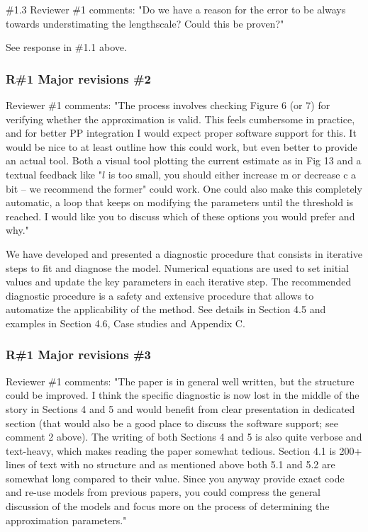 \documentclass[11pt]{report}
\begin{document}
\noindent \#1.3 Reviewer \#1 comments: "Do we have a reason for the error to be always towards understimating the lengthscale? Could this be proven?"

See response in \#1.1 above.


\subsubsection*{R\#1 Major revisions \#2}

Reviewer \#1 comments: "The process involves checking Figure 6 (or 7) for verifying whether the approximation is valid. This feels cumbersome in practice, and for better PP integration I would expect proper software support for this. It would be nice to at least outline how this could work, but even better to provide an actual tool. Both a visual tool plotting the current estimate as in Fig 13 and a textual feedback like "$\hat l$ is too small, you should either increase m or decrease c a bit -- we recommend the former" could work. One could also make this completely automatic, a loop that keeps on modifying the parameters until the threshold is reached. I would like you to discuss which of these options you would prefer and why."

We have developed and presented a diagnostic procedure that consists in iterative steps to fit and diagnose the model. Numerical equations are used to set initial values and update the key parameters in each iterative step. The recommended diagnostic procedure is a safety and extensive procedure that allows to automatize the applicability of the method. See details in Section 4.5 and examples in Section 4.6, Case studies and Appendix C.

\subsubsection*{R\#1 Major revisions \#3}

Reviewer \#1 comments: "The paper is in general well written, but the structure could be improved. I think the specific diagnostic is now lost in the middle of the story in Sections 4 and 5 and would benefit from clear presentation in dedicated section (that would also be a good place to discuss the software support; see comment 2 above). The writing of both Sections 4 and 5 is also quite verbose and text-heavy, which makes reading the paper somewhat tedious. Section 4.1 is 200+ lines of text with no structure and as mentioned above both 5.1 and 5.2 are somewhat long compared to their value. Since you anyway provide exact code and re-use models from previous papers, you could compress the general discussion of the models and focus more on the process of determining the approximation parameters."
\end{document}
